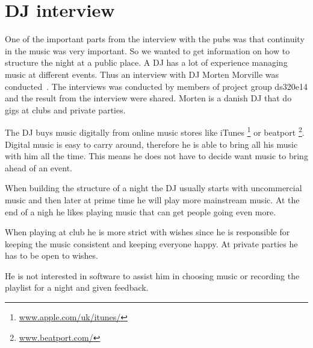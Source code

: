 \section{DJ interview}
One of the important parts from the interview with the pubs was that continuity in the music was very important. So we wanted to get information on how to structure the night at a public place. A DJ has a lot of experience managing music at different events. Thus an interview with DJ Morten Morville was conducted~\cite{int_dj}. The interviews was conducted by members of project group ds320e14 and the result from the interview were shared. Morten is a danish DJ that do gigs at clubs and private parties.

The DJ buys music digitally from online music stores like iTunes \footnote{\url{www.apple.com/uk/itunes/}} or beatport \footnote{\url{www.beatport.com/}}. Digital music is easy to carry around, therefore he is able to bring all his music with him all the time. This means he does not have to decide want music to bring ahead of an event.

When building the structure of a night the DJ usually starts with uncommercial music and then later at prime time he will play more mainstream music. At the end of a nigh he likes playing music that can get people going even more.

When playing at club he is more strict with wishes since he is responsible for keeping the music consistent and keeping everyone happy. At private parties he has to be open to wishes.

He is not interested in software to assist him in choosing music or recording the playlist for a night and given feedback.
